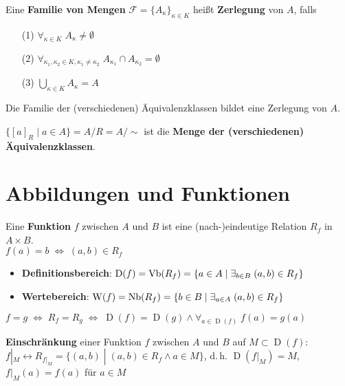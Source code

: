 \linie
\pagebreak

Eine \textbf{Familie von Mengen} $\mathcal{F} = \{A_\kappa\}_{\kappa \in K}$
heißt \textbf{Zerlegung} von $A$, falls

\begin{itemize}
    \item[(1)] $\forall_{\kappa \in K}\; A_\kappa \not= \emptyset$

    \item[(2)] $\forall_{\kappa_1, \kappa_2 \in K, \kappa_1 \not= \kappa_2}\;
    A_{\kappa_1} \cap A_{\kappa_2} = \emptyset$

    \item[(3)] $\bigcup_{\kappa \in K} A_\kappa = A$
\end{itemize}

Die Familie der (verschiedenen) Äquivalenzklassen bildet eine Zerlegung von
$A$.

$\{[a]_R \;|\; a \in A\} = A/R = A/\!\!\sim$ ist die \textbf{Menge der
(verschiedenen) Äquivalenzklassen}.

\section{%
    Abbildungen und Funktionen%
}

Eine \textbf{Funktion} $f$ zwischen $A$ und $B$ ist eine (nach-)eindeutige
Relation $R_f$ in $A \times B$. \\
$f(a) = b \;\Leftrightarrow\; (a, b) \in R_f$

\begin{itemize}
    \item \textbf{Definitionsbereich}:
    $\operatorname{D}(f) = \operatorname{Vb}(R_f) =
    \{a \in A \;|\; \exists_{b \in B}\; (a,b) \in R_f\}$

    \item \textbf{Wertebereich}:
    $\operatorname{W}(f) = \operatorname{Nb}(R_f) =
    \{b \in B \;|\; \exists_{a \in A}\; (a,b) \in R_f\}$
\end{itemize}

$f = g \;\Leftrightarrow\; R_f = R_g \;\Leftrightarrow\;
\operatorname{D}(f) = \operatorname{D}(g) \land
\forall_{a \in \operatorname{D}(f)}\; f(a) = g(a)$

\textbf{Einschränkung} einer Funktion $f$ zwischen $A$ und $B$ auf
$M \subset \operatorname{D}(f)$: \\
$f|_M \leftrightarrow R_{f|_M} = \{(a,b) \;|\; (a,b) \in R_f \land a \in M\}$,
d.\,h. $\operatorname{D}(f|_M) = M$, $f|_{M}(a) = f(a)$ für $a \in M$

